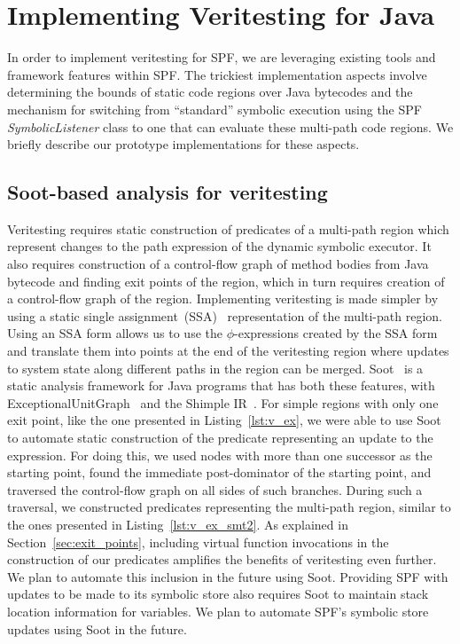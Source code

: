 \section{Implementing Veritesting for Java}
In order to implement veritesting for SPF, we are leveraging existing tools and framework features within SPF.  The trickiest implementation aspects involve determining the bounds of static code regions over Java bytecodes and the mechanism for switching from ``standard'' symbolic execution using the SPF {\em SymbolicListener} class to one that can evaluate these multi-path code regions. We briefly describe our prototype implementations for these aspects.
%
\subsection{Soot-based analysis for veritesting}
%
Veritesting requires static construction of
predicates of a multi-path region which represent changes to the path expression of the dynamic
symbolic executor.
%
It also requires construction of a control-flow graph of method bodies
from Java bytecode and finding exit points of the region, which in turn
requires creation of a control-flow graph of the region.
%
Implementing veritesting is made simpler by using a static single
assignment~(SSA)~\cite{ssa} representation of the multi-path region.
%
Using an SSA form allows us to use the $\phi$-expressions created by the
SSA form and translate them into points at the end of the veritesting
region where updates to system state along different paths in the region
can be merged.
%
Soot~\cite{soot} is a static analysis framework for Java programs that
has both these features, with
ExceptionalUnitGraph~\cite{exceptionalunitgraph} and the Shimple
IR~\cite{shimple}.
%
For simple regions with only one exit point, like the one presented in Listing~\ref{lst:v_ex}, we
were able to use Soot to automate static construction of the predicate representing
an update to the expression.
%
For doing this, we used nodes with more than one successor as the
starting point, found the immediate post-dominator of the starting
point, and traversed the control-flow graph on all sides of such branches.
%
During such a traversal, we constructed predicates representing the
multi-path region, similar to the ones presented in
Listing~\ref{lst:v_ex_smt2}.
%
As explained in Section~\ref{sec:exit_points}, including virtual
function invocations in the construction of our predicates amplifies the
benefits of veritesting even further.
%
We plan to automate this inclusion in the future using Soot.
%
Providing SPF with updates to be made to its symbolic store also
requires Soot to maintain stack location information for variables.
%
We plan to automate SPF\rq s symbolic store updates using Soot in the
future.
%

